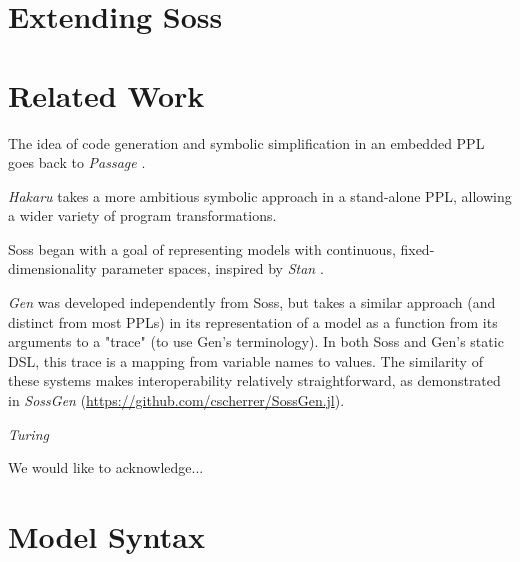 \documentclass[anonymous=false, %
               format=acmsmall, %
               review=true, %
               screen=true, %
               nonacm=true]{acmart}
\begin{document}
\section{Extending Soss}

\section{Related Work}

The idea of code generation and symbolic simplification in an embedded PPL goes back to \emph{Passage} \cite{Scherrer2012}. 

\emph{Hakaru} \cite{narayanan2016probabilistic} takes a more ambitious symbolic approach in a stand-alone PPL, allowing a wider variety of program transformations. 

Soss began with a goal of representing models with continuous, fixed-dimensionality parameter spaces, inspired by \emph{Stan} \cite{stan:2017}.

\emph{Gen} \cite{Cusumano-Towner:2019} was developed independently from Soss, but takes a similar approach (and distinct from most PPLs) in its representation of a model as a function from its arguments to a "trace" (to use Gen's terminology). In both Soss and Gen's static DSL, this trace is a mapping from variable names to values. The similarity of these systems makes interoperability relatively straightforward, as demonstrated in \emph{SossGen} (\url{https://github.com/cscherrer/SossGen.jl}).

\emph{Turing} \cite{ge2018t}

\begin{acks}
We would like to acknowledge...
\end{acks}




\appendix

\section{Model Syntax}
\end{document}

